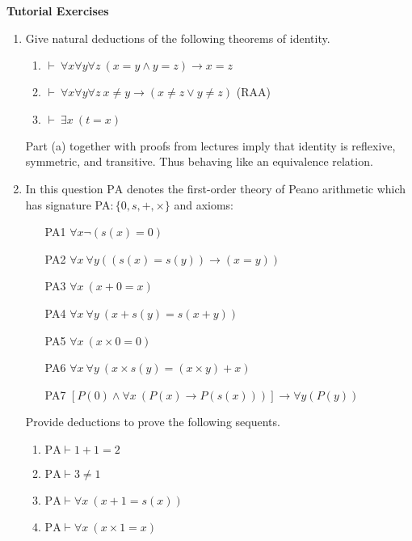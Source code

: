 \documentclass[11pt]{report}
\begin{document}
\newpage
{\bf Tutorial Exercises}
\begin{enumerate}

	\item Give natural deductions of the following theorems of identity.
	
	\begin{enumerate}
		\item $\vdash \ \forall x \forall y \forall z \ (x = y \land y = z) \to x = z$
		\item $\vdash \ \forall x \forall y \forall z \ x \neq y \to (x \neq z \lor y \neq z)$ \hspace{5cm} (RAA)
		\item $\vdash \ \exists x \ (t = x)$
	\end{enumerate}

	Part (a) together with proofs from lectures imply that identity is reflexive, symmetric, and transitive. Thus behaving like an equivalence relation. 
	
	\item In this question $\text{PA}$ denotes the first-order theory of Peano arithmetic which has signature PA$: \{0,s,+,\times\}$ and axioms:
	
	\begin{enumerate}
		\item[PA1] $\forall x \lnot(s(x) = 0)$
		\item[PA2] $\forall x \ \forall y ((s(x) = s(y)) \to (x = y))$
		\item[PA3] $\forall x \ (x + 0 = x)$
		\item[PA4] $\forall x \ \forall y \ (x + s(y) = s(x + y))$
		\item[PA5] $\forall x \ (x \times 0 = 0)$
		\item[PA6] $\forall x \ \forall y \ (x \times s(y) = (x \times y) + x)$
		\item[PA7] $[P(0) \land \forall x \ (P(x) \to P(s(x)))] \rightarrow \forall y (P(y))$
	\end{enumerate}	
	
	Provide deductions to prove the following sequents. 
	
	\begin{enumerate}
		\item $\text{PA} \vdash 1 + 1 = 2$
		\item $\text{PA} \vdash 3 \neq 1$
		\item $\text{PA} \vdash \forall x \ (x + 1 = s(x))$
		\item $\text{PA} \vdash \forall x \ (x \times 1 = x)$ 		
	\end{enumerate}


\end{enumerate}
\end{document}
